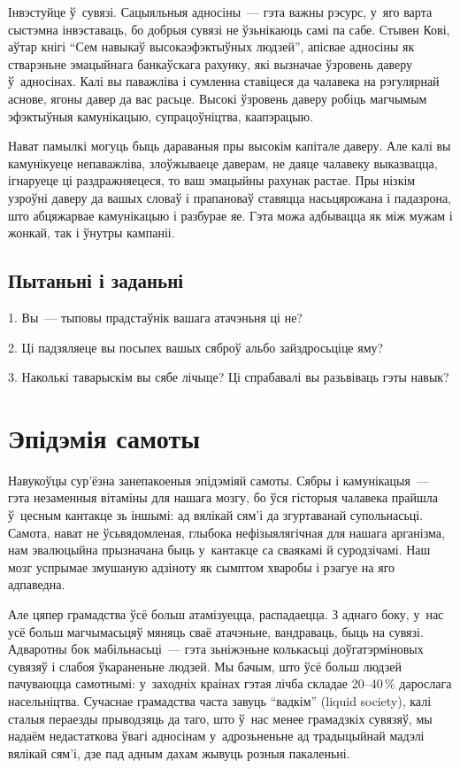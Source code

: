 Інвэстуйце ў~сувязі. Сацыяльныя адносіны~--- гэта важны рэсурс, у~яго варта сыстэмна інвэставаць, бо добрыя сувязі не ўзьнікаюць самі па сабе. Стывен Кові, аўтар кнігі ``Сем навыкаў высокаэфэктыўных людзей'', апісвае адносіны як стварэньне эмацыйнага банкаўскага рахунку, які вызначае ўзровень даверу ў~адносінах. Калі вы паважліва і сумленна ставіцеся да чалавека на рэгулярнай аснове, ягоны давер да вас расьце. Высокі ўзровень даверу робіць магчымым эфэктыўныя камунікацыю, супрацоўніцтва, каапэрацыю.

Нават памылкі могуць быць дараваныя пры высокім капітале даверу. Але калі вы камунікуеце непаважліва, злоўжываеце даверам, не даяце чалавеку выказвацца, ігнаруеце ці раздражняецеся, то ваш эмацыйны рахунак растае. Пры нізкім узроўні даверу да вашых словаў і прапановаў ставяцца насьцярожана і падазрона, што абцяжарвае камунікацыю і разбурае яе. Гэта можа адбывацца як між мужам і жонкай, так і ўнутры кампаніі.

\subsection*{Пытаньні і заданьні}

1. Вы~--- тыповы прадстаўнік вашага атачэньня ці не?

2. Ці падзяляеце вы посьпех вашых сяброў альбо зайздросьціце яму?

3. Наколькі таварыскім вы сябе лічыце? Ці спрабавалі вы разьвіваць гэты навык?


\section{Эпідэмія самоты}

Навукоўцы сур'ёзна занепакоеныя эпідэміяй самоты. Сябры і камунікацыя~--- гэта незаменныя вітаміны для нашага мозгу, бо ўся гісторыя чалавека прайшла ў~цесным кантакце зь іншымі: ад вялікай сям'і да згуртаванай супольнасьці. Самота, нават не ўсьвядомленая, глыбока нефізыялягічная для нашага арганізма, нам эвалюцыйна прызначана быць у~кантакце са сваякамі й суродзічамі. Наш мозг успрымае змушаную адзіноту як сымптом хваробы і рэагуе на яго адпаведна.

Але цяпер грамадства ўсё больш атамізуецца, распадаецца. З аднаго боку, у~нас усё больш магчымасьцяў мяняць сваё атачэньне, вандраваць, быць на сувязі. Адваротны бок мабільнасьці~--- гэта зьніжэньне колькасьці доўгатэрміновых сувязяў і слабоя ўкараненьне людзей. Мы бачым, што ўсё больш людзей пачуваюцца самотнымі: у~заходніх краінах гэтая лічба складае 20--40\,\% дарослага насельніцтва. Сучаснае грамадства часта завуць ``вадкім'' (liquid society), калі сталыя пераезды прыводзяць да таго, што ў~нас менее грамадзкіх сувязяў, мы надаём недастаткова ўвагі адносінам у~адрозьненьне ад традыцыйнай мадэлі вялікай сям'і, дзе пад адным дахам жывуць розныя пакаленьні.

